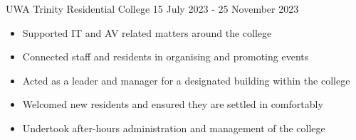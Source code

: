 \documentclass[paper=a4,fontsize=9pt]{resume}
\begin{document}
{	\divider

		{UWA Trinity Residential College}
		{15 July 2023 - 25 November 2023}
	\begin{itemize}
		\item Supported IT and AV related matters around the college
		\item Connected staff and residents in organising and promoting events
		\item Acted as a leader and manager for a designated building within the college
		\item Welcomed new residents and ensured they are settled in comfortably
		\item Undertook after-hours administration and management of the college
	\end{itemize}






}

\makebody
\end{document}
